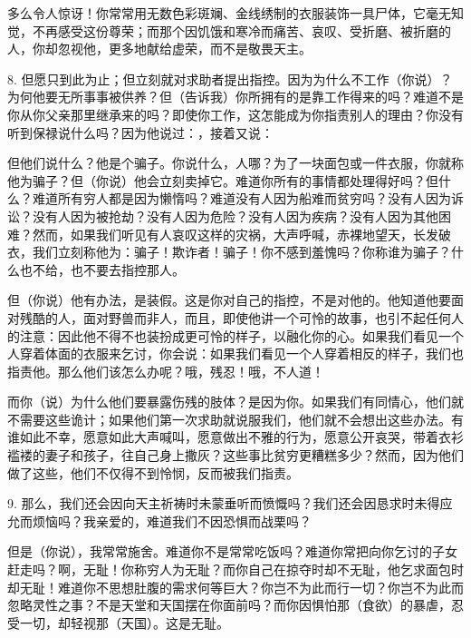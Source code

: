 多么令人惊讶！你常常用无数色彩斑斓、金线绣制的衣服装饰一具尸体，它毫无知觉，不再感受这份尊荣；而那个因饥饿和寒冷而痛苦、哀叹、受折磨、被折磨的人，你却忽视他，更多地献给虚荣，而不是敬畏天主。\par

8. 但愿只到此为止；但立刻就对求助者提出指控。因为为什么不工作（你说）？为何他要无所事事被供养？但（告诉我）你所拥有的是靠工作得来的吗？难道不是你从你父亲那里继承来的吗？即使你工作，这怎能成为你指责别人的理由？你没有听到保禄说什么吗？因为他说过：，接着又说：\par

但他们说什么？他是个骗子。你说什么，人哪？为了一块面包或一件衣服，你就称他为骗子？但（你说）他会立刻卖掉它。难道你所有的事情都处理得好吗？但什么？难道所有穷人都是因为懒惰吗？难道没有人因为船难而贫穷吗？没有人因为诉讼？没有人因为被抢劫？没有人因为危险？没有人因为疾病？没有人因为其他困难？然而，如果我们听见有人哀叹这样的灾祸，大声呼喊，赤裸地望天，长发破衣，我们立刻称他为：骗子！欺诈者！骗子！你不感到羞愧吗？你称谁为骗子？什么也不给，也不要去指控那人。\par

但（你说）他有办法，是装假。这是你对自己的指控，不是对他的。他知道他要面对残酷的人，面对野兽而非人，而且，即使他讲一个可怜的故事，也引不起任何人的注意：因此他不得不也装扮成更可怜的样子，以融化你的心。如果我们看见一个人穿着体面的衣服来乞讨，你会说：如果我们看见一个人穿着相反的样子，我们也指责他。那么他们该怎么办呢？哦，残忍！哦，不人道！\par

而你（说）为什么他们要暴露伤残的肢体？是因为你。如果我们有同情心，他们就不需要这些诡计；如果他们第一次求助就说服我们，他们就不会想出这些办法。有谁如此不幸，愿意如此大声喊叫，愿意做出不雅的行为，愿意公开哀哭，带着衣衫褴褛的妻子和孩子，往自己身上撒灰？这些事比贫穷更糟糕多少？然而，因为他们做了这些，他们不仅得不到怜悯，反而被我们指责。\par

9. 那么，我们还会因向天主祈祷时未蒙垂听而愤慨吗？我们还会因恳求时未得应允而烦恼吗？我亲爱的，难道我们不因恐惧而战栗吗？\par

但是（你说），我常常施舍。难道你不是常常吃饭吗？难道你常把向你乞讨的子女赶走吗？啊，无耻！你称穷人为无耻？而你自己在掠夺时却不无耻，他乞求面包时却无耻！难道你不思想肚腹的需求何等巨大？你岂不为此而行一切？你岂不为此而忽略灵性之事？不是天堂和天国摆在你面前吗？而你因惧怕那（食欲）的暴虐，忍受一切，却轻视那（天国）。这是无耻。\par

